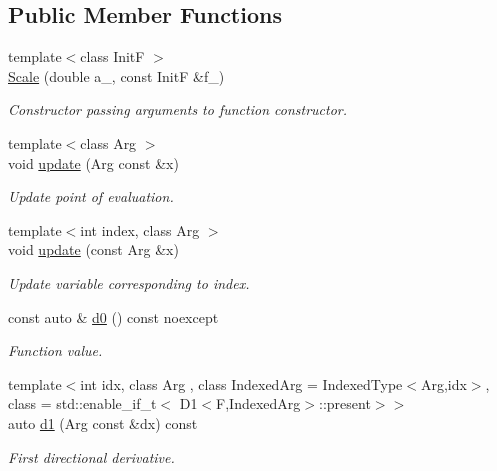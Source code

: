 \subsection*{Public Member Functions}
\begin{DoxyCompactItemize}
\item 
{\footnotesize template$<$class Init\+F $>$ }\\\hyperlink{structFunG_1_1MathematicalOperations_1_1Scale_ab86612b868aaee66786793da2ec7a54a}{Scale} (double a\+\_\+, const Init\+F \&f\+\_\+)
\begin{DoxyCompactList}\small\item\em Constructor passing arguments to function constructor. \end{DoxyCompactList}\item 
{\footnotesize template$<$class Arg $>$ }\\void \hyperlink{structFunG_1_1MathematicalOperations_1_1Scale_aecf868f7b64e89e67053a328642a8fd3}{update} (Arg const \&x)
\begin{DoxyCompactList}\small\item\em Update point of evaluation. \end{DoxyCompactList}\item 
{\footnotesize template$<$int index, class Arg $>$ }\\void \hyperlink{structFunG_1_1MathematicalOperations_1_1Scale_a49b277539bf6582956f68d325ce4a44d}{update} (const Arg \&x)
\begin{DoxyCompactList}\small\item\em Update variable corresponding to index. \end{DoxyCompactList}\item 
const auto \& \hyperlink{structFunG_1_1MathematicalOperations_1_1Scale_ae49c1126f8dbc9d3b03e6890392b86ea}{d0} () const noexcept
\begin{DoxyCompactList}\small\item\em Function value. \end{DoxyCompactList}\item 
{\footnotesize template$<$int idx, class Arg , class Indexed\+Arg  = Indexed\+Type$<$\+Arg,idx$>$, class  = std\+::enable\+\_\+if\+\_\+t$<$ D1$<$\+F,\+Indexed\+Arg$>$\+::present$>$$>$ }\\auto \hyperlink{structFunG_1_1MathematicalOperations_1_1Scale_a63b6f3353439de0125836020bd2b15ba}{d1} (Arg const \&dx) const 
\begin{DoxyCompactList}\small\item\em First directional derivative. \end{DoxyCompactList}\item 

\end{DoxyCompactItemize}
